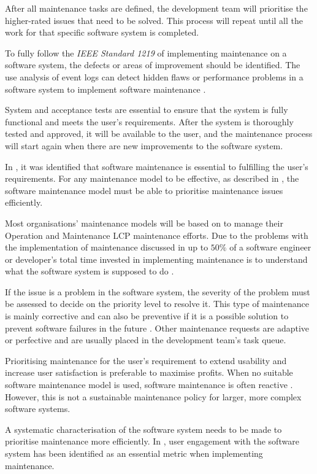 \par After all maintenance tasks are defined, the development team will prioritise the higher-rated issues that need to be solved. This process will repeat until all the work for that specific software system is completed. 

\par To fully follow the \textit{IEEE Standard 1219} of implementing maintenance on a software system, the defects or areas of improvement should be identified. The use analysis of event logs can detect hidden flaws or performance problems in a software system to implement software maintenance \cite{Cinque2013, Rong2018a, Levin2019}.

\par System and acceptance tests are essential to ensure that the system is fully functional and meets the user's requirements. After the system is thoroughly tested and approved, it will be available to the user, and the maintenance process will start again when there are new improvements to the software system.\par In , it was identified that software maintenance is essential to fulfilling the user's requirements. For any maintenance model to be effective, as described in , the software maintenance model must be able to prioritise maintenance issues efficiently. \par Most organisations' maintenance models will be based on  to manage their Operation and Maintenance LCP maintenance efforts. Due to the problems with the implementation of maintenance discussed in  up to $50\%$ of a software engineer or developer's total time invested in implementing maintenance is to understand what the software system is supposed to do \cite{Tang2010}. \par If the issue is a problem in the software system, the severity of the problem must be assessed to decide on the priority level to resolve it. This type of maintenance is mainly corrective and can also be preventive if it is a possible solution to prevent software failures in the future \cite{Tang2010}. Other maintenance requests are adaptive or perfective and are usually placed in the development team's task queue. \par Prioritising maintenance for the user's requirement to extend usability and increase user satisfaction is preferable to maximise profits. When no suitable software maintenance model is used, software maintenance is often reactive \cite{Araujo2021}. However, this is not a sustainable maintenance policy for larger, more complex software systems. \par A systematic characterisation of the software system needs to be made to prioritise maintenance more efficiently. In , user engagement with the software system has been identified as an essential metric when implementing maintenance.

